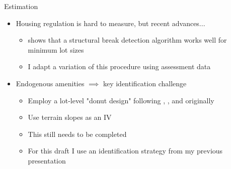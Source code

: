 \documentclass{beamer}
\begin{document}
\begin{frame}{Estimation}
\begin{itemize}
	\itemsep1em
	\color{black}
	\item Housing regulation is hard to measure, but recent advances...
	\begin{itemize}
		\item \cite{Song} shows that a structural break detection algorithm works well for minimum lot sizes
		
		\item I adapt a variation of this procedure using assessment data
	\end{itemize}

	\item Endogenous amenities $\implies$ key identification challenge
	\begin{itemize}
		\item Employ a lot-level "donut design" following \cite{kulka}, \cite{anagoletal2021}, and originally \cite{BFMJPE}
		\item Use terrain slopes as an IV 
		\item This still needs to be completed
		\item For this draft I use an identification strategy from my previous presentation 
	\end{itemize}
\end{itemize}	
\end{frame}
\end{document}
